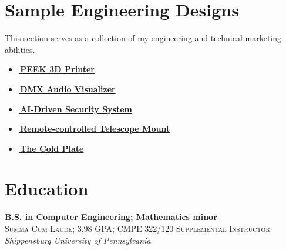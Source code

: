 \documentclass[
	12pt, %
]{FreemanCV}
\begin{document}

\vspace*{-10pt}
\section{Sample Engineering Designs}
{
	This section serves as a collection of my engineering and technical marketing abilities.
	\vspace*{-7pt}
	\begin{itemize}[leftmargin=10pt]
		\itemsep-5pt
		\item \href{https://github.com/jfcbooth/3dpp}{\linkcolor\scriptsize\faLink\normalcolor\normalsize\,\textbf{PEEK 3D Printer}}
		\item \href{https://github.com/microchip-pic-avr-examples/pic16f56q71-audio-light-show-mplab-mcc}{\linkcolor\scriptsize\faLink\normalcolor\normalsize\,\textbf{DMX Audio Visualizer}}
		\item \href{https://github.com/jfcbooth/security_system}{\linkcolor\scriptsize\faLink\normalcolor\normalsize\,\textbf{AI-Driven Security System}}
		\item \href{https://github.com/jfcbooth/hadley_electric_stand}{\linkcolor\scriptsize\faLink\normalcolor\normalsize\,\textbf{Remote-controlled Telescope Mount}}
		\item \href{https://github.com/microchip-pic-avr-examples/pic16f17146-cold-plate-mplab-mcc}{\linkcolor\scriptsize\faLink\normalcolor\normalsize\,\textbf{The Cold Plate}}
	\end{itemize}
}

\section{Education}
	\textbf{B.S. in Computer Engineering; Mathematics minor}\\ %
	\small\textsc{Summa Cum Laude; 3.98 GPA; CMPE 322/120 Supplemental Instructor}\\ %
	\textit{Shippensburg University of Pennsylvania}\\ %

\end{document}
